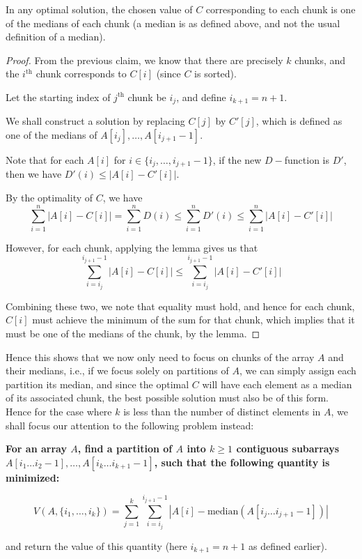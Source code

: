 \begin{claim}
In any optimal solution, the chosen value of $C$ corresponding to each chunk is one of the medians of each chunk (a median is as defined above, and not the usual definition of a median).
\end{claim}
\begin{proof}

    From the previous claim, we know that there are precisely $k$ chunks, and the $i^\mathrm{th}$ chunk corresponds to $C[i]$ (since $C$ is sorted). 

    Let the starting index of $j^\mathrm{th}$ chunk be $i_j$, and define $i_{k + 1} = n + 1$.

    We shall construct a solution by replacing $C[j]$ by $C'[j]$, which is defined as one of the medians of $A[i_j], \ldots, A[i_{j + 1} - 1]$.

    Note that for each $A[i]$ for $i \in \{i_j, \ldots, i_{j+1}-1\}$, if the new $D-$function is $D'$, then we have $D'(i) \le |A[i] - C'[i]|$.

    By the optimality of $C$, we have
    $$\sum_{i = 1}^n |A[i] - C[i]| = \sum_{i = 1}^n D(i) \le \sum_{i = 1}^n D'(i) \le \sum_{i = 1}^n |A[i] - C'[i]|$$

    However, for each chunk, applying the lemma gives us that 
    $$\sum_{i = i_j}^{i_{j+1} - 1} |A[i] - C[i]| \le \sum_{i = i_j}^{i_{j+1} - 1} |A[i] - C'[i]|$$

    Combining these two, we note that equality must hold, and hence for each chunk, $C[i]$ must achieve the minimum of the sum for that chunk, which implies that it must be one of the medians of the chunk, by the lemma.
\end{proof}

Hence this shows that we now only need to focus on chunks of the array $A$ and their medians, i.e., if we focus solely on partitions of $A$, we can simply assign each partition its median, and since
the optimal $C$ will have each element as a median of its associated chunk, the best possible solution must also be of this form.\\

Hence for the case where $k$ is less than the number of distinct elements in $A$, we shall focus our attention to the following problem instead:

{\bf
For an array $A$, find a partition of $A$ into $k \ge 1$ contiguous subarrays $A[i_1\ldots i_2 - 1], \ldots, A[i_k\ldots i_{k+1} - 1]$, such that the following quantity is minimized:

$$V(A, \{i_1, \ldots, i_k\}) = \sum_{j = 1}^k \sum_{i = i_j}^{i_{j+1} - 1} |A[i] - \text{median}(A[i_j\ldots i_{j+1} - 1])| $$

and return the value of this quantity (here $i_{k+1} = n + 1$ as defined earlier).
}

